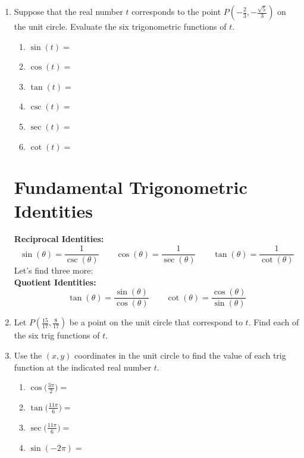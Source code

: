 \documentclass[11pt]{article}
\begin{document}
\begin{enumerate}
\item Suppose that the real number $t$ corresponds to the point $P(-\frac{2}{3},-\frac{\sqrt{5}}{3})$ on the unit circle.  Evaluate the six trigonometric functions of $t$.
\begin{enumerate}
\item $\sin(t)=$\\[.5in]
\item $\cos(t)=$ \\[.5in]
\item $\tan(t)=$ \\[.5in]
\item $\csc(t)=$ \\[.5in]
\item $\sec(t)=$ \\[.5in]
\item $\cot(t)=$ \\[.5in]
\end{enumerate}

\section{Fundamental Trigonometric Identities}

\textbf{Reciprocal Identities:  }
$$\sin(\theta)=\frac{1}{\csc(\theta)} \quad \quad \cos(\theta)=\frac{1}{\sec(\theta)} \quad \quad \tan(\theta)=\frac{1}{\cot(\theta)}$$
Let's find three more:\\[.2in]

\textbf{Quotient Identities:  }
$$\tan(\theta)=\frac{\sin(\theta)}{\cos(\theta)} \quad \quad \cot(\theta)=\frac{\cos(\theta)}{\sin(\theta)}$$

\item Let $P(\frac{15}{17}, \frac{8}{17})$ be a point on the unit circle that correspond to $t$.  Find each of the six trig functions of $t$.\\[1.7in]

\item Use the $(x,y)$ coordinates in the unit circle to find the value of each trig function at the indicated real number $t$.\\

\begin{enumerate}
\item $\displaystyle \cos\Big(\frac{3\pi}{2}\Big)=$\\[.2in]
\item $\displaystyle \tan\Big(\frac{11\pi}{6}\Big)=$\\[.5in]
\item $\displaystyle \sec\Big(\frac{11\pi}{6}\Big)=$\\[.5in]
\item $\displaystyle \sin(-2\pi)=$\\[.2in]
\end{enumerate}


\end{enumerate}
\end{document}
